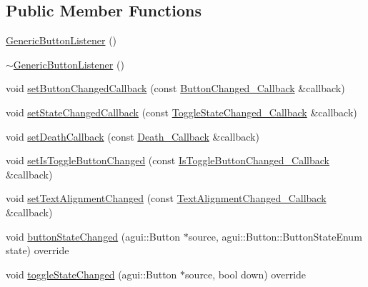 \subsection*{Public Member Functions}
\begin{DoxyCompactItemize}
\item 
\mbox{\hyperlink{classec_1_1_generic_button_listener_acb6d403ce900c66f622fb52ebae32b49}{Generic\+Button\+Listener}} ()
\item 
\mbox{\hyperlink{classec_1_1_generic_button_listener_a1cfd5eba97748a8f0b41ef48d248299c}{$\sim$\+Generic\+Button\+Listener}} ()
\item 
void \mbox{\hyperlink{classec_1_1_generic_button_listener_a477874968f1f815d0d794b4b0f8a0b9e}{set\+Button\+Changed\+Callback}} (const \mbox{\hyperlink{classec_1_1_generic_button_listener_af89147c1baeadae9155f5d4e0df7abf3}{Button\+Changed\+\_\+\+Callback}} \&callback)
\item 
void \mbox{\hyperlink{classec_1_1_generic_button_listener_ae0c80aab630fff656c387b5a2d42c3ec}{set\+State\+Changed\+Callback}} (const \mbox{\hyperlink{classec_1_1_generic_button_listener_a528d9bd01250d4e2d7179ad64d67a364}{Toggle\+State\+Changed\+\_\+\+Callback}} \&callback)
\item 
void \mbox{\hyperlink{classec_1_1_generic_button_listener_ab44a076729d26fc80ae05fc155c735a1}{set\+Death\+Callback}} (const \mbox{\hyperlink{classec_1_1_generic_button_listener_aa7ca8b30098ab89eff663950d25a13eb}{Death\+\_\+\+Callback}} \&callback)
\item 
void \mbox{\hyperlink{classec_1_1_generic_button_listener_a7fc06552479c6ec92ec2d2cb07f66910}{set\+Is\+Toggle\+Button\+Changed}} (const \mbox{\hyperlink{classec_1_1_generic_button_listener_a7830a9f92b6e68acbbf5237d2154db95}{Is\+Toggle\+Button\+Changed\+\_\+\+Callback}} \&callback)
\item 
void \mbox{\hyperlink{classec_1_1_generic_button_listener_a58bc422969d370e80904cb09ad241109}{set\+Text\+Alignment\+Changed}} (const \mbox{\hyperlink{classec_1_1_generic_button_listener_a62ab7e0ca7d7777b9aec72d7f2caf300}{Text\+Alignment\+Changed\+\_\+\+Callback}} \&callback)
\item 
void \mbox{\hyperlink{classec_1_1_generic_button_listener_a3ee5c4b3d94c44007fe530c96b403193}{button\+State\+Changed}} (agui\+::\+Button $\ast$source, agui\+::\+Button\+::\+Button\+State\+Enum state) override
\item 
void \mbox{\hyperlink{classec_1_1_generic_button_listener_a78eb86e35bbc12e5df2f1496ed1cd85c}{toggle\+State\+Changed}} (agui\+::\+Button $\ast$source, bool down) override

\end{DoxyCompactItemize}
